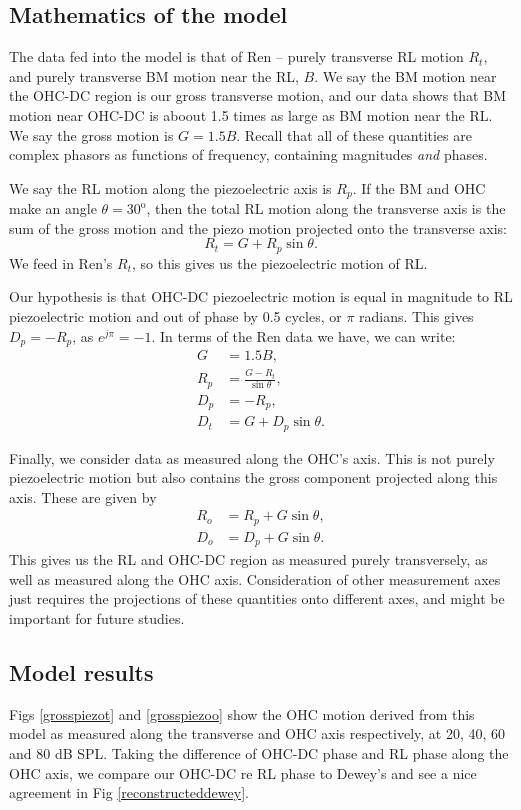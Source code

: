 \documentclass{article}
\begin{document}
\subsection{Mathematics of the model}
\par{The data fed into the model is that of Ren -- purely transverse RL motion $R_t$, and purely transverse BM motion near the RL, $B$. We say the BM motion near the OHC-DC region is our gross transverse motion, and our data shows that BM motion near OHC-DC is aboout 1.5 times as large as BM motion near the RL. We say the gross motion is $G = 1.5B$. Recall that all of these quantities are complex phasors as functions of frequency, containing magnitudes \textit{and} phases.}
\par{We say the RL motion along the piezoelectric axis is $R_p$. If the BM and OHC make an angle $\theta = 30^{\text{o}}$, then the total RL motion along the transverse axis is the sum of the gross motion and the piezo motion projected onto the transverse axis:
	\begin{equation}
		R_t = G + R_p \sin{\theta}.
	\end{equation}
We feed in Ren's $R_t$, so this gives us the piezoelectric motion of RL.}
\par{Our hypothesis is that OHC-DC piezoelectric motion is equal in magnitude to RL piezoelectric motion and out of phase by 0.5 cycles, or $\pi$ radians. This gives $D_p = -R_p$, as $e^{j\pi} = -1$. In terms of the Ren data we have, we can write:
	\begin{align}
		G &= 1.5B, \\
		R_p &= \frac{G - R_t}{\sin\theta}, \\
		D_p &= -R_p, \\
		D_t &= G + D_p\sin\theta.
	\end{align}
}
\par{Finally, we consider data as measured along the OHC's axis. This is not purely piezoelectric motion but also contains the gross component projected along this axis. These are given by
	\begin{align}
		R_o &= R_p + G\sin\theta, \\
		D_o &= D_p + G\sin\theta.
	\end{align}
This gives us the RL and OHC-DC region as measured purely transversely, as well as measured along the OHC axis. Consideration of other measurement axes just requires the projections of these quantities onto different axes, and might be important for future studies.}
\subsection{Model results}
\par{Figs \ref{grosspiezot} and \ref{grosspiezoo} show the OHC motion derived from this model as measured along the transverse and OHC axis respectively, at 20, 40, 60 and 80 dB SPL. Taking the difference of OHC-DC phase and RL phase along the OHC axis, we compare our OHC-DC re RL phase to Dewey's and see a nice agreement in Fig \ref{reconstructeddewey}.}
\end{document}

